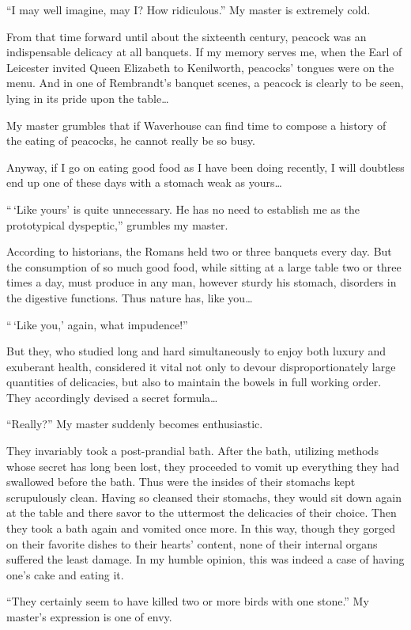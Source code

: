 \documentclass[12pt, openright]{book}
\begin{document}
``I may well imagine, may I? How ridiculous.'' My master is extremely
cold.

From that time forward until about the sixteenth century, peacock was an
indispensable delicacy at all banquets. If my memory serves me, when the
Earl of Leicester invited Queen Elizabeth to Kenilworth, peacocks'
tongues were on the menu. And in one of Rembrandt's banquet scenes, a
peacock is clearly to be seen, lying in its pride upon the table\ldots{}

My master grumbles that if Waverhouse can find time to compose a history
of the eating of peacocks, he cannot really be so busy.

Anyway, if I go on eating good food as I have been doing recently, I
will doubtless end up one of these days with a stomach weak as
yours\ldots{}

``\,`Like yours' is quite unnecessary. He has no need to establish me as
the prototypical dyspeptic,'' grumbles my master.

According to historians, the Romans held two or three banquets every
day. But the consumption of so much good food, while sitting at a large
table two or three times a day, must produce in any man, however sturdy
his stomach, disorders in the digestive functions. Thus nature has, like
you\ldots{}

``\,`Like you,' again, what impudence!''

But they, who studied long and hard simultaneously to enjoy both luxury
and exuberant health, considered it vital not only to devour
disproportionately large quantities of delicacies, but also to maintain
the bowels in full working order. They accordingly devised a secret
formula\ldots{}

``Really?'' My master suddenly becomes enthusiastic.

They invariably took a post-prandial bath. After the bath, utilizing
methods whose secret has long been lost, they proceeded to vomit up
everything they had swallowed before the bath. Thus were the insides of
their stomachs kept scrupulously clean. Having so cleansed their
stomachs, they would sit down again at the table and there savor to the
uttermost the delicacies of their choice. Then they took a bath again
and vomited once more. In this way, though they gorged on their favorite
dishes to their hearts' content, none of their internal organs suffered
the least damage. In my humble opinion, this was indeed a case of having
one's cake and eating it.

``They certainly seem to have killed two or more birds with one stone.''
My master's expression is one of envy.
\end{document}
